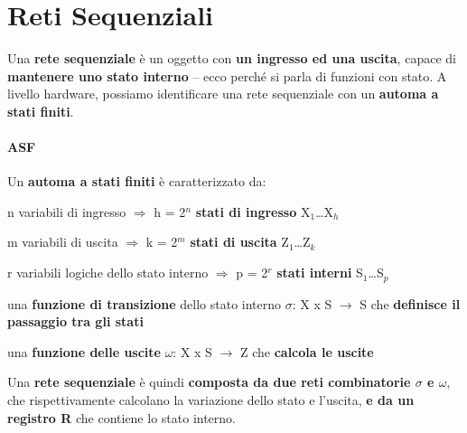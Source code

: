 \documentclass[10pt]{report}
\begin{document}
\section{Reti Sequenziali}
Una \textbf{rete sequenziale} è un oggetto con \textbf{un ingresso ed una uscita}, capace di \textbf{mantenere uno stato interno} -- ecco perché si parla di funzioni con stato. A livello hardware, possiamo identificare una rete sequenziale con un \textbf{automa a stati finiti}.
\paragraph{ASF} Un \textbf{automa a stati finiti} è caratterizzato da:
\begin{list}{}{}
	\item n variabili di ingresso $\Rightarrow$ h = 2$^n$ \textbf{stati di ingresso} X$_1$\ldots X$_h$
	\item m variabili di uscita $\Rightarrow$ k = 2$^m$ \textbf{stati di uscita} Z$_1$\ldots Z$_k$
	\item r variabili logiche dello stato interno $\Rightarrow$ p = 2$^r$ \textbf{stati interni} S$_1$\ldots S$_p$
	\item una \textbf{funzione di transizione} dello stato interno $\sigma$: X x S $\rightarrow$ S che \textbf{definisce il passaggio tra gli stati}
	\item una \textbf{funzione delle uscite} $\omega$: X x S $\rightarrow$ Z che \textbf{calcola le uscite}
\end{list}
Una \textbf{rete sequenziale} è quindi \textbf{composta da due reti combinatorie $\sigma$ e $\omega$}, che rispettivamente calcolano la variazione dello stato e l'uscita, \textbf{e da un registro R} che contiene lo stato interno.
\end{document}
